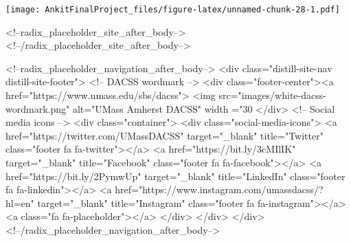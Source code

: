 \documentclass[
]{article}
\begin{document}
\texttt{[image: AnkitFinalProject\_files/figure-latex/unnamed-chunk-28-1.pdf]}

<!--radix_placeholder_site_after_body-->
<!--/radix_placeholder_site_after_body-->

<!--radix_placeholder_navigation_after_body-->
<div class="distill-site-nav distill-site-footer">
<!-- DACSS wordmark -->
<div class="footer-center"><a href="https://www.umass.edu/sbs/dacss">
  <img src="images/white-dacss-wordmark.png" 
  alt="UMass Amherst DACSS" width ="30%
</div>
<!-- Social media icons -->
<div class="container">
  <div class="social-media-icons">
    <a href="https://twitter.com/UMassDACSS" target="_blank" title="Twitter" class="footer fa fa-twitter"></a>
    <a href="https://bit.ly/3cMIlIK" target="_blank" title="Facebook" class="footer fa fa-facebook"></a>
    <a href="https://bit.ly/2PymwUp" target="_blank" title="LinkedIn" class="footer fa fa-linkedin"></a>
    <a href="https://www.instagram.com/umassdacss/?hl=en" target="_blank" title="Instagram" class="footer fa fa-instagram"></a>
    <a class="fa fa-placeholder"></a>
  </div>
</div>
</div>
<!--/radix_placeholder_navigation_after_body-->
\end{document}
